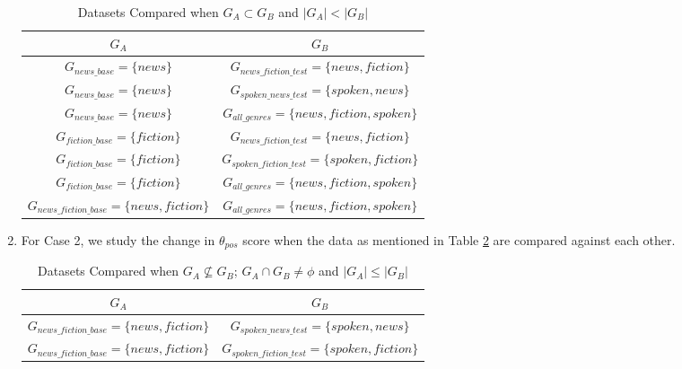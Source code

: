\begin{enumerate}
\begin{table}[H]
\begin{tabular}{|c|c|}
                \hline
                \textbf{$G_{A}$} & \textbf{$G_{B}$} \\
                \hline
                $G_{news\_base} = \{news\}$ & $G_{news\_fiction\_test} = \{news, fiction\}$\\
                $G_{news\_base} = \{news\}$ & $G_{spoken\_news\_test} = \{spoken, news\}$\\
                $G_{news\_base} = \{news\}$ & $G_{all\_genres} = \{news, fiction, spoken\}$\\
                \hline
                $G_{fiction\_base} = \{fiction\}$ & $G_{news\_fiction\_test} = \{news, fiction\}$\\
                $G_{fiction\_base} = \{fiction\}$ & $G_{spoken\_fiction\_test} = \{spoken, fiction\}$\\
                $G_{fiction\_base} = \{fiction\}$ & $G_{all\_genres} = \{news, fiction, spoken\}$\\
                \hline
                $G_{news\_fiction\_base} = \{news, fiction\}$ & $G_{all\_genres} = \{news, fiction, spoken\}$\\
                \hline
            \end{tabular}
            \caption{Datasets Compared when $G_{A} \subset G_{B}$ and $\vert G_{A} \vert < \vert G_{B} \vert$}
            \label{tab:case1_genre}
        \end{table}
    \item For Case 2, we study the change in $\theta_{pos}$ score when the data as mentioned in Table \ref{tab:case2_genre} are compared against each other.
        \begin{table}[H]
            \centering
            \begin{tabular}{|c|c|}
                \hline
                \textbf{$G_{A}$} & \textbf{$G_{B}$} \\
                \hline
                $G_{news\_fiction\_base} = \{news, fiction\}$ & $G_{spoken\_news\_test} = \{spoken, news\}$\\
                $G_{news\_fiction\_base} = \{news, fiction\}$ & $G_{spoken\_fiction\_test} = \{spoken, fiction\}$\\
                \hline
            \end{tabular}
            \caption{Datasets Compared when $G_{A} \not \subseteq G_{B}$; $G_{A} \cap G_{B} \neq \phi$ and $\vert G_{A} \vert \leq \vert G_{B} \vert$}
            \label{tab:case2_genre}
        \end{table}

\end{enumerate}
